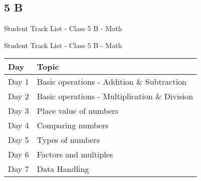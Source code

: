 
    \subsection{5 B}
    \renewcommand{\insertclass}{ - Class 5 B}
    \renewcommand{\insertsubject}{- Math}
    \begin{frame}[shrink=25]{Student Track List - Class 5 B - Math}
    \vspace{-0.3cm}
    \scriptsize
    \begin{multicols}{4}

\columnbreak

\columnbreak

\columnbreak



    \end{multicols}
    \end{frame}

\begin{frame}[shrink=25]{Student Track List - Class 5 B - Math}
    \vspace{-0.3cm}
\renewcommand{\arraystretch}{2}
\centering
\begin{tabular}{|>{\centering\arraybackslash}m{2cm}|>{\centering\arraybackslash}m{10cm}|}
\hline
\rowcolor{pink!50} \textbf{Day} & \textbf{Topic} \\
\hline
Day 1 & Basic operations - Addition \& Subtraction \\
\hline
Day 2 & Basic operations - Multiplication \& Division \\
\hline
Day 3 & Place value of numbers \\
\hline
Day 4 & Comparing numbers \\
\hline
Day 5 & Types of numbers \\
\hline
Day 6 & Factors and multiples \\
\hline
Day 7 & Data Handling \\
\hline
\end{tabular}

\end{frame}
    